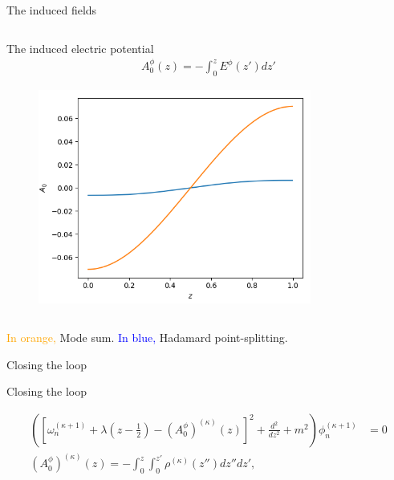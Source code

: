 \begin{frame}{The induced fields}
\begin{columns}
{	    \begin{column}{0.5\textwidth}
		    	    The induced electric potential
		    	    \begin{align}
	A_0^{\phi}(z) = -\int_{0}^{z} E^{\phi}(z') dz'
		    	    \end{align}
		        \begin{figure}[h]
		        	\centering
		        	\includegraphics[width=0.8\textwidth]{figures/renormalization_comparison_induced_A0.png}
		        \end{figure}
		        \end{column}
		}
	\end{columns}
	\begin{centering}
		\hspace{2cm} \textcolor{orange}{In orange,} Mode sum. \textcolor{blue}{In blue,} Hadamard point-splitting.
	\end{centering}
\end{frame}

\begin{frame}{Closing the loop}
		
\end{frame}

\begin{frame}{Closing the loop}

\begin{align}
			\left(
				\left[ 
			\omega^{\left( \kappa+1 \right) }_n 
	+ \lambda \left( z - \frac{1}{2} \right) 
- \left( A_0^{\phi} \right) ^{\left(\kappa  \right) }(z)  \right]^2 
	+ \frac{d^2}{dz^2} + m^2  \right)
	\phi^{\left( \kappa + 1 \right) }_n &= 0 \\
	\left(A_0^{\phi}  \right) ^{(\kappa)}(z) = -\int_{0}^{z} \int_{0}^{z'} \rho^{(\kappa)}(z'')dz''   dz'
,
\end{align}
\end{frame}

